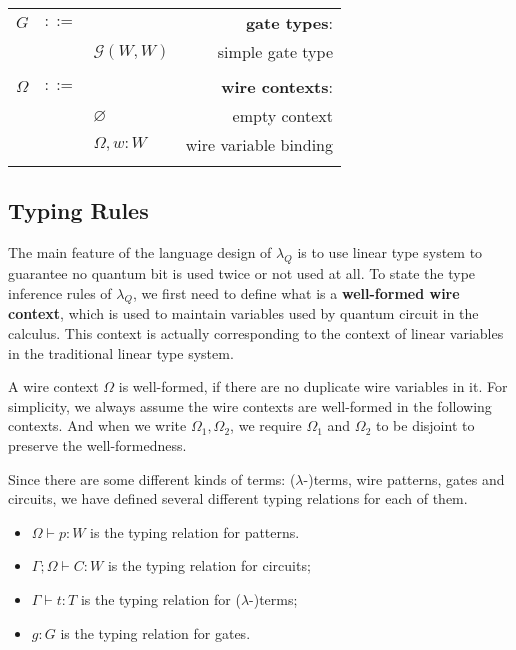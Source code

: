 \begin{longtable}[c]{lclr}
  $G$ &$::=$ &  &\textbf{gate types}:\\
      & &$\mathcal{G}(W, W)$ &simple gate type\\
  \\

  $\Omega$ &$::=$ &  &\textbf{wire contexts}: \\
      & &$\varnothing$ &empty context\\
      & &$\Omega,w:W$ &wire variable binding\\
  \\

  \bottomrule
  
\end{longtable}

\subsection{Typing Rules} \label{typing}
The main feature of the language design of $\lambda_Q$ is to use linear type system to guarantee no quantum bit is used twice or not used at all.
To state the type inference rules of $\lambda_Q$, we first need to define what is a \textbf{well-formed wire context}, which is used to maintain variables used by quantum circuit in the calculus.
This context is actually corresponding to the context of linear variables in the traditional linear type system.
\begin{Def}
  A wire context $\Omega$ is well-formed, if there are no duplicate wire variables in it.
  For simplicity, we always assume the wire contexts are well-formed in the following contexts. And when we write $\Omega_1, \Omega_2$, we require $\Omega_1$ and $\Omega_2$ to be disjoint to preserve the well-formedness.
\end{Def}

Since there are some different kinds of terms: ($\lambda$-)terms, wire patterns, gates and circuits, we have defined several different typing relations for each of them.
\begin{itemize}
  \item $\Omega \vdash p : W$ is the typing relation for patterns.
  \item $\Gamma ; \Omega \vdash C : W$ is the typing relation for circuits;
  \item $\Gamma \vdash t:T$ is the typing relation for ($\lambda$-)terms;
  \item $g : G$ is the typing relation for gates.
\end{itemize}


